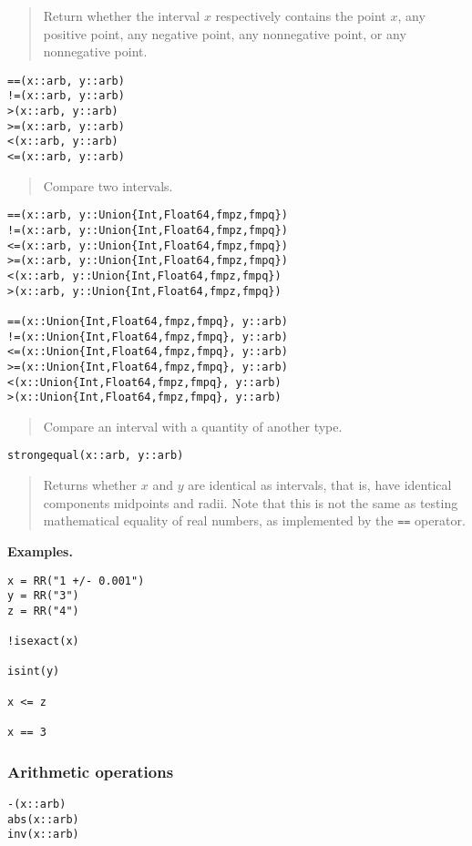 \documentclass[a4paper,10pt]{article}
\newcommand{\code}{\lstinline}
\newcommand{\desc}[1]{\vspace{-3mm}\begin{quote}#1\end{quote}}
\begin{document}
{{\desc{Return whether the interval $x$ respectively contains the
point $x$, any positive point, any negative point, any nonnegative point,
or any nonnegative point.}

\begin{lstlisting}
==(x::arb, y::arb)
!=(x::arb, y::arb)
>(x::arb, y::arb)
>=(x::arb, y::arb)
<(x::arb, y::arb)
<=(x::arb, y::arb)
\end{lstlisting}

\desc{Compare two intervals.}

\begin{lstlisting}
==(x::arb, y::Union{Int,Float64,fmpz,fmpq})
!=(x::arb, y::Union{Int,Float64,fmpz,fmpq})
<=(x::arb, y::Union{Int,Float64,fmpz,fmpq})
>=(x::arb, y::Union{Int,Float64,fmpz,fmpq})
<(x::arb, y::Union{Int,Float64,fmpz,fmpq})
>(x::arb, y::Union{Int,Float64,fmpz,fmpq})

==(x::Union{Int,Float64,fmpz,fmpq}, y::arb)
!=(x::Union{Int,Float64,fmpz,fmpq}, y::arb)
<=(x::Union{Int,Float64,fmpz,fmpq}, y::arb)
>=(x::Union{Int,Float64,fmpz,fmpq}, y::arb)
<(x::Union{Int,Float64,fmpz,fmpq}, y::arb)
>(x::Union{Int,Float64,fmpz,fmpq}, y::arb)
\end{lstlisting}

\desc{Compare an interval with a quantity of another type.}

\begin{lstlisting}
strongequal(x::arb, y::arb)
\end{lstlisting}

\desc{Returns whether $x$ and $y$ are identical as intervals, that is,
have identical components midpoints and radii. Note that this is
not the same as testing mathematical equality of real numbers,
as implemented by the \code{==} operator.}

\textbf{Examples.}

\begin{lstlisting}
x = RR("1 +/- 0.001")
y = RR("3")
z = RR("4")

!isexact(x)

isint(y)

x <= z

x == 3

\end{lstlisting}

\subsubsection{Arithmetic operations}

\begin{lstlisting}
-(x::arb)
abs(x::arb)
inv(x::arb)


\end{lstlisting}}}
\end{document}

